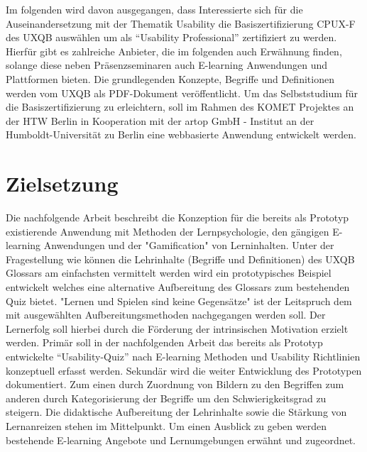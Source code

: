\documentclass[a4paper, 12pt, twoside, BCOR=20mm, DIV=calc, abstracton, parskip=half*, toc=bibliography, toc=listof, headsepline, footsepline, headings=small, numbers=enddot]{scrreprt}
\begin{document}
	Im folgenden wird davon ausgegangen, dass Interessierte sich für die Auseinandersetzung mit der Thematik Usability die Basiszertifizierung \ac{CPUX}-F des \ac{UXQB} auswählen um als "`Usability Professional"' zertifiziert zu werden. Hierfür gibt es zahlreiche Anbieter, die im folgenden auch Erwähnung finden, solange diese neben Präsenzseminaren auch E-learning Anwendungen und Plattformen bieten. 
	Die grundlegenden Konzepte, Begriffe und Definitionen werden vom \ac{UXQB} als PDF-Dokument veröffentlicht\cite{cpux-f}. Um das Selbststudium für die Basiszertifizierung zu erleichtern, soll im Rahmen des KOMET Projektes an der \ac{HTW Berlin} %
	in Kooperation mit der artop GmbH - Institut an der Humboldt-Universität zu Berlin eine webbasierte Anwendung entwickelt werden\cite{KOMET}. 
		
		
	\section{Zielsetzung}
	Die nachfolgende Arbeit beschreibt die Konzeption für die bereits als Prototyp existierende Anwendung mit Methoden der Lernpsychologie, den gängigen E-learning Anwendungen und der "Gamification" von Lerninhalten. Unter der Fragestellung wie können die Lehrinhalte (Begriffe und Definitionen) des \ac{UXQB} Glossars am einfachsten vermittelt werden wird ein prototypisches Beispiel entwickelt welches eine alternative Aufbereitung des Glossars zum bestehenden Quiz bietet. "Lernen und Spielen sind keine Gegensätze" \cite{dewey1995erfahrung}
	ist der Leitspruch dem mit ausgewählten Aufbereitungsmethoden nachgegangen werden soll. Der Lernerfolg soll hierbei durch die Förderung der intrinsischen Motivation erzielt werden. 
	Primär soll in der nachfolgenden Arbeit das bereits als Prototyp entwickelte "`Usability-Quiz"' nach E-learning Methoden und Usability Richtlinien konzeptuell erfasst werden. Sekundär wird die weiter Entwicklung des Prototypen dokumentiert. Zum einen durch Zuordnung von Bildern zu den Begriffen zum anderen durch Kategorisierung der Begriffe um den Schwierigkeitsgrad zu steigern. Die didaktische Aufbereitung der Lehrinhalte sowie die Stärkung von Lernanreizen stehen im Mittelpunkt. Um einen Ausblick zu geben werden bestehende E-learning Angebote und Lernumgebungen erwähnt und zugeordnet. 
	
\end{document}
